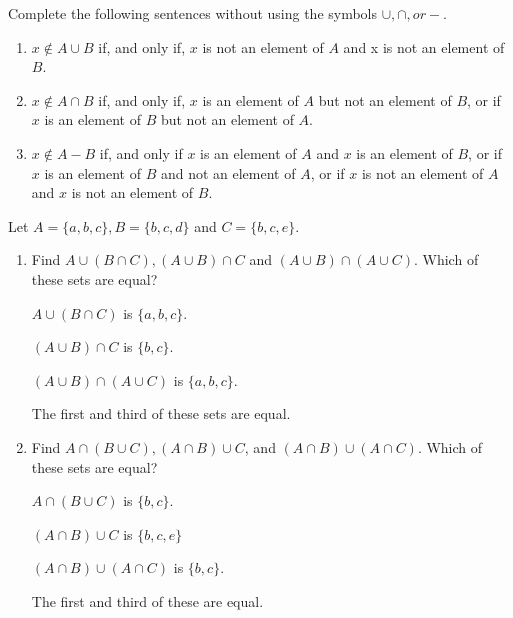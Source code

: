 \documentclass[12pt]{article}
\newenvironment{modenumerate}
  {\enumerate\setupmodenumerate}
  {\endenumerate}
\newif\ifmoditem
\newcommand{\setupmodenumerate}{%
  \global\moditemfalse
  \let\origmakelabel\makelabel
  \def\moditem##1{\global\moditemtrue\def\mesymbol{##1}\item}%
  \def\makelabel##1{%
    \origmakelabel{##1\ifmoditem\rlap{\mesymbol}\fi\enspace}%
    \global\moditemfalse}%
}
\begin{document}
\begin{modenumerate}
  \setcounter{enumi}{8}
\item %
Complete the following sentences without using the symbols $\cup, \cap, or -$.
\begin{enumerate}
\item $x \not\in A \cup B$ if, and only if, $x$ is not an element of $A$ and x is not an element of $B$.
\item $x \not\in A \cap B$ if, and only if, $x$ is an element of $A$ but not an element of $B$, or if $x$ is
  an element of $B$ but not an element of $A$.
\item $x \not\in A - B$ if, and only if $x$ is an element of $A$ and $x$ is an element of $B$, or if $x$ is an
  element of $B$ and not an element of $A$, or if $x$ is not an element of $A$ and $x$ is not an element of
  $B$.
\end{enumerate}
  \setcounter{enumi}{15}
\moditem{*} %
Let $A = \{a,b,c\}, B = \{b,c,d\}$ and $C = \{b,c,e\}$.
\begin{enumerate}
\item Find $A \cup (B \cap C), (A \cup B) \cap C$ and $(A \cup B) \cap (A \cup C)$. Which of these sets are
  equal?

$A \cup (B \cap C)$ is $\{a,b,c\}$.

$(A \cup B) \cap C$ is $\{b,c\}$.

$(A \cup B) \cap (A \cup C)$ is $\{a,b,c\}$.

The first and third of these sets are equal.
\item Find $A \cap (B \cup C), (A \cap B) \cup C$, and $(A \cap B) \cup (A \cap C)$. Which of these sets are
  equal?

$A \cap (B \cup C)$ is $\{b,c\}$.

$(A \cap B) \cup C$ is $\{b,c,e\}$

$(A \cap B) \cup (A \cap C)$ is $\{b,c\}$.

The first and third of these are equal.

\end{enumerate}
  \setcounter{enumi}{18}
\item %
  \setcounter{enumi}{21}
\item %
\end{modenumerate}
\end{document}
